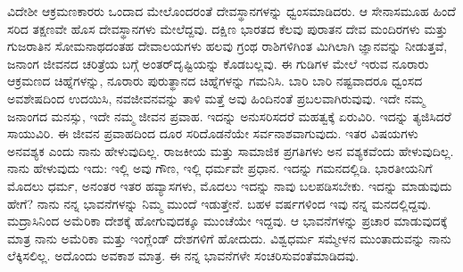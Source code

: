ವಿದೇಶೀ ಆಕ್ರಮಣಕಾರರು ಒಂದಾದ ಮೇಲೊಂದರಂತೆ ದೇವಸ್ಥಾನಗಳನ್ನು ಧ್ವಂಸಮಾಡಿದರು. ಆ ಸೇನಾಸಮೂಹ ಹಿಂದೆ ಸರಿದ ತಕ್ಷಣವೇ ಹೊಸ ದೇವಸ್ಥಾನಗಳು ಮೇಲೆದ್ದವು. ದಕ್ಷಿಣ ಭಾರತದ ಕೆಲವು ಪುರಾತನ ದೇವ ಮಂದಿರಗಳು ಮತ್ತು ಗುಜರಾತಿನ ಸೋಮನಾಥದಂತಹ ದೇವಾಲಯಗಳು ಹಲವು ಗ್ರಂಥ ರಾಶಿಗಳಿಗಿಂತ ಮಿಗಿಲಾಗಿ ಜ್ಞಾನವನ್ನು ನೀಡುತ್ತವೆ, ಜನಾಂಗ ಜೀವನದ ಚರಿತ್ರೆಯ ಬಗ್ಗೆ ಅಂತರ್​ದೃಷ್ಟಿಯನ್ನು ಕೊಡಬಲ್ಲವು. ಈ ಗುಡಿಗಳ ಮೇಲೆ ಇರುವ ನೂರಾರು ಆಕ್ರಮಣದ ಚಿಹ್ನೆಗಳನ್ನು, ನೂರಾರು ಪುರುತ್ಥಾನದ ಚಿಹ್ನೆಗಳನ್ನು ಗಮನಿಸಿ. ಬಾರಿ ಬಾರಿ ನಷ್ಟವಾದರೂ ಧ್ವಂಸದ ಅವಶೇಷದಿಂದ ಉದಯಿಸಿ, ನವಜೀವನವನ್ನು ತಾಳಿ ಮತ್ತೆ ಅವು ಹಿಂದಿನಂತೆ ಪ್ರಬಲವಾಗಿರುವುವು. ಇದೇ ನಮ್ಮ ಜನಾಂಗದ ಮನಸ್ಸು, ಇದೇ ನಮ್ಮ ಜೀವನ ಪ್ರವಾಹ. ಇದನ್ನು ಅನುಸರಿಸದರೆ ಮಹತ್ವಕ್ಕೆ ಏರುವಿರಿ. ಇದನ್ನು ತ್ಯಜಿಸಿದರೆ ಸಾಯುವಿರಿ. ಈ ಜೀವನ ಪ್ರವಾಹದಿಂದ ದೂರ ಸರಿದೊಡನೆಯೇ ಸರ್ವನಾಶವಾಗುವುದು. ಇತರ ವಿಷಯಗಳು ಅನವಶ್ಯಕ ಎಂದು ನಾನು ಹೇಳುವುದಿಲ್ಲ. ರಾಜಕೀಯ ಮತ್ತು ಸಾಮಾಜಿಕ ಪ್ರಗತಿಗಳು ಅನ ವಶ್ಯಕವೆಂದು ಹೇಳುವುದಿಲ್ಲ. ನಾನು ಹೇಳುವುದು ಇದು: ಇಲ್ಲಿ ಅವು ಗೌಣ, ಇಲ್ಲಿ ಧರ್ಮವೇ ಪ್ರಧಾನ. ಇದನ್ನು ಗಮನದಲ್ಲಿಡಿ. ಭಾರತೀಯನಿಗೆ ಮೊದಲು ಧರ್ಮ, ಅನಂತರ ಇತರ ಹವ್ಯಾಸಗಳು, ಮೊದಲು ಇದನ್ನು ನಾವು ಬಲಪಡಿಸಬೇಕು. ಇದನ್ನು ಮಾಡುವುದು ಹೇಗೆ? ನಾನು ನನ್ನ ಭಾವನೆಗಳನ್ನು ನಿಮ್ಮ ಮುಂದೆ ಇಡುತ್ತೇನೆ. ಬಹಳ ವರ್ಷಗಳಿಂದ ಇವು ನನ್ನ ಮನದಲ್ಲಿದ್ದವು. ಮದ್ರಾಸಿನಿಂದ ಅಮೆರಿಕಾ ದೇಶಕ್ಕೆ ಹೋಗುವುದಕ್ಕೂ ಮುಂಚೆಯೇ ಇದ್ದವು. ಆ ಭಾವನೆಗಳನ್ನು ಪ್ರಚಾರ ಮಾಡುವುದಕ್ಕೆ ಮಾತ್ರ ನಾನು ಅಮೆರಿಕಾ ಮತ್ತು ಇಂಗ್ಲೆಂಡ್​ ದೇಶಗಳಿಗೆ ಹೋದುದು. ವಿಶ್ವಧರ್ಮ ಸಮ್ಮೇಳನ ಮುಂತಾದುವನ್ನು ನಾನು ಲೆಕ್ಕಿಸಲಿಲ್ಲ. ಅದೊಂದು ಅವಕಾಶ ಮಾತ್ರ. ಈ ನನ್ನ ಭಾವನೆಗಳೇ ಸಂಚರಿಸುವಂತೆಮಾಡಿದವು. 


